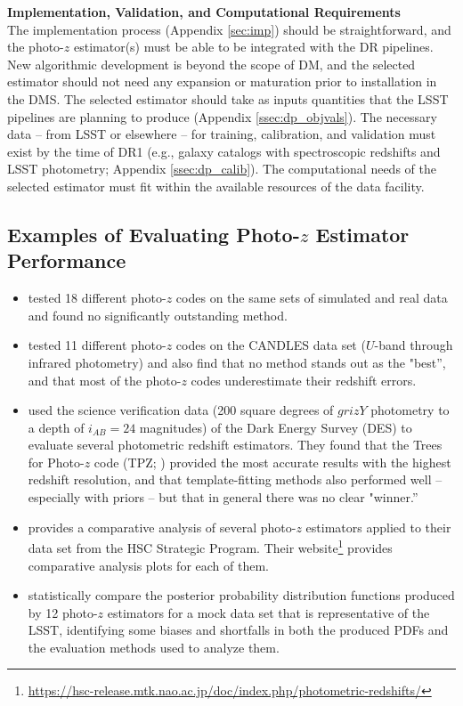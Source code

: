 \documentclass[DM,lsstdraft,toc]{lsstdoc}
\begin{document}
{\bf Implementation, Validation, and Computational Requirements}\\
The implementation process (Appendix \ref{sec:imp}) should be straightforward, and the photo-$z$ estimator(s) must be able to be integrated with the DR pipelines. 
New algorithmic development is beyond the scope of DM, and the selected estimator should not need any expansion or maturation prior to installation in the DMS.
The selected estimator should take as inputs quantities that the LSST pipelines are planning to produce (Appendix \ref{ssec:dp_objvals}).
The necessary data -- from LSST or elsewhere -- for training, calibration, and validation must exist by the time of DR1 (e.g., galaxy catalogs with spectroscopic redshifts and LSST photometry; Appendix \ref{ssec:dp_calib}).
The computational needs of the selected estimator must fit within the available resources of the data facility.


\subsection{Examples of Evaluating Photo-$z$ Estimator Performance}\label{ssec:eval_eval}

\begin{itemize}
\item \citet{2010A&A...523A..31H} tested 18 different photo-$z$ codes on the same sets of simulated and real data and found no significantly outstanding method.
\item \citet{2013ApJ...775...93D} tested 11 different photo-$z$ codes on the CANDLES data set ($U$-band through infrared photometry) and also find that no method stands out as the "best'', and that most of the photo-$z$ codes underestimate their redshift errors.
\item \citet{2014MNRAS.445.1482S} used the science verification data (200 square degrees of $grizY$ photometry to a depth of $i_{AB}=24$ magnitudes) of the Dark Energy Survey (DES) to evaluate several photometric redshift estimators. They found that the Trees for Photo-$z$ code (TPZ; \citet{2013ascl.soft04011C}) provided the most accurate results with the highest redshift resolution, and that template-fitting methods also performed well -- especially with priors -- but that in general there was no clear "winner.''
\item \citet{2018PASJ...70S...9T} provides a comparative analysis of several photo-$z$ estimators applied to their data set from the HSC Strategic Program. Their website\footnote{\url{https://hsc-release.mtk.nao.ac.jp/doc/index.php/photometric-redshifts/}} provides comparative analysis plots for each of them.
\item \citet{2020arXiv200103621S} statistically compare the posterior probability distribution functions produced by 12 photo-$z$ estimators for a mock data set that is representative of the LSST, identifying some biases and shortfalls in both the produced PDFs and the evaluation methods used to analyze them.
\end{itemize}
\end{document}
